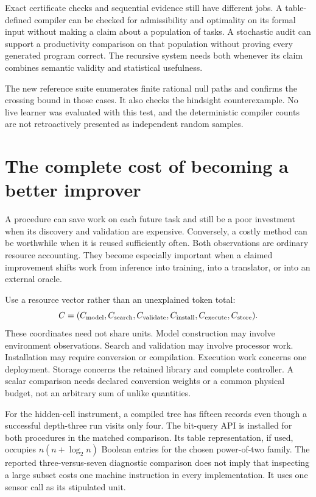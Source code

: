 \documentclass[11pt,letterpaper]{article}
\theoremstyle{plain}
\theoremstyle{definition}
\begin{document}
Exact certificate checks and sequential evidence still have different jobs. A table-defined compiler can be checked for admissibility and optimality on its formal input without making a claim about a population of tasks. A stochastic audit can support a productivity comparison on that population without proving every generated program correct. The recursive system needs both whenever its claim combines semantic validity and statistical usefulness.

The new reference suite enumerates finite rational null paths and confirms the crossing bound in those cases. It also checks the hindsight counterexample. No live learner was evaluated with this test, and the deterministic compiler counts are not retroactively presented as independent random samples.

\section{The complete cost of becoming a better improver}\label{sec:cost}
A procedure can save work on each future task and still be a poor investment when its discovery and validation are expensive. Conversely, a costly method can be worthwhile when it is reused sufficiently often. Both observations are ordinary resource accounting. They become especially important when a claimed improvement shifts work from inference into training, into a translator, or into an external oracle.

Use a resource vector rather than an unexplained token total:
\[
C=(C_{\rm model},C_{\rm search},C_{\rm validate},C_{\rm install},
C_{\rm execute},C_{\rm store}).
\]
These coordinates need not share units. Model construction may involve environment observations. Search and validation may involve processor work. Installation may require conversion or compilation. Execution work concerns one deployment. Storage concerns the retained library and complete controller. A scalar comparison needs declared conversion weights or a common physical budget, not an arbitrary sum of unlike quantities.

For the hidden-cell instrument, a compiled tree has fifteen records even though a successful depth-three run visits only four. The bit-query API is installed for both procedures in the matched comparison. Its table representation, if used, occupies $n(n+\log_2n)$ Boolean entries for the chosen power-of-two family. The reported three-versus-seven diagnostic comparison does not imply that inspecting a large subset costs one machine instruction in every implementation. It uses one sensor call as its stipulated unit.
\end{document}
